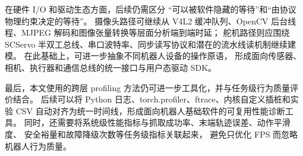 \begin{conclusion}
在硬件 I/O 和驱动生态方面，后续仍需区分
“可以被软件隐藏的等待”和“由协议物理约束决定的等待”。
摄像头路径可继续从 V4L2 缓冲队列、OpenCV 后台线程、MJPEG 解码和图像张量转换等层面分析端到端时延；
舵机路径则应围绕 SCServo 半双工总线、串口波特率、同步读写协议和潜在的流水线读机制继续建模。
在此基础上，可进一步抽象不同机器人设备的操作原语，
形成面向传感器、相机、执行器和通信总线的统一接口与用户态驱动 SDK。

最后，本文使用的跨层 profiling 方法仍可进一步工具化，并与任务级行为质量评价结合。
后续可以将 Python 日志、torch.profiler、ftrace、内核自定义插桩和实验 CSV
自动对齐为统一时间线，形成面向机器人基础软件的可复用性能诊断工具。
同时，还需要将系统级性能指标与抓取成功率、末端轨迹误差、动作平滑度、
安全裕量和故障降级次数等任务级指标关联起来，
避免只优化 FPS 而忽略机器人行为质量。
\endgroup
\end{conclusion}
